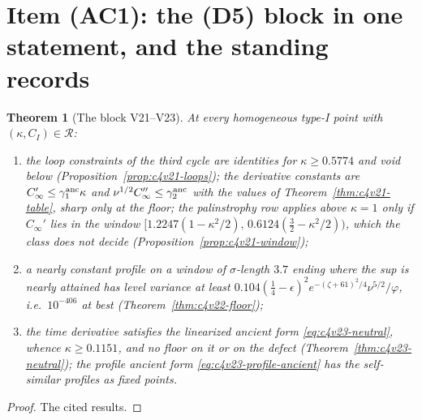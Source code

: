 \documentclass[11pt]{article}
\theoremstyle{plain}
\newtheorem{theorem}{Theorem}[section]
\theoremstyle{definition}
\theoremstyle{remark}
\begin{document}
\section{Item (AC1): the (D5) block in one statement, and the standing records}
\label{sec:c4v24-block}

\begin{theorem}[The block V21--V23]
\label{thm:c4v24-block}
At every homogeneous type-I point with \((\kappa,C_I)\in\mathcal R\):
\begin{enumerate}[label=\textup{(\roman*)},leftmargin=3.2em]
\item the loop constraints of the third cycle are identities for
      \(\kappa\ge0.5774\) and void below (Proposition~\ref{prop:c4v21-loops}); the
      derivative constants are \(C_\infty'\le\gamma_1^{\rm anc}\kappa\) and \(\nu^{1/2}C_\infty''\le\gamma_2^{\rm anc}\) with the
      values of Theorem~\ref{thm:c4v21-table}, sharp only at the floor;
      the palinstrophy row applies above \(\kappa=1\) only if \(C_\infty'\) lies in the
      window \([1.2247(1-\kappa^2/2),\,0.6124(\frac32-\kappa^2/2))\), which the class does
      not decide (Proposition~\ref{prop:c4v21-window});
\item a nearly constant profile on a window of \(\sigma\)-length \(3.7\) ending
      where the sup is nearly attained has level variance at least
      \(0.104(\frac14-\epsilon)^2e^{-(\zeta+61)^2/4}\nu^{5/2}/\varphi\), i.e.\ \(10^{-406}\) at best
      (Theorem~\ref{thm:c4v22-floor});
\item the time derivative satisfies the linearized ancient form
      \eqref{eq:c4v23-neutral}, whence \(\kappa\ge0.1151\), and no floor on it or on the
      defect (Theorem~\ref{thm:c4v23-neutral}); the profile ancient form
      \eqref{eq:c4v23-profile-ancient} has the self-similar profiles as
      fixed points.
\end{enumerate}
\end{theorem}

\begin{proof}
The cited results.
\end{proof}
\end{document}
